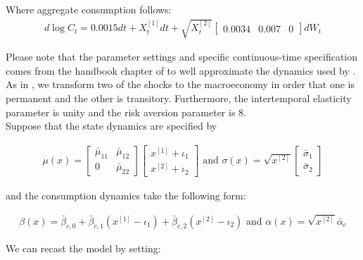 \documentclass[12pt]{article}
\begin{document}
Where aggregate consumption follows:
\begin{align*}
d\log{C_t} = 0.0015dt + X^{[1]}_t  dt + \sqrt{X^{[2]}_t} \begin{bmatrix} 0.0034 & 0.007 & 0 \end{bmatrix} dW_t
\end{align*}

Please note that the parameter settings and specific continuous-time specification comes from the handbook chapter of \cite{HHLR} to well approximate the dynamics used by \citet{bansal_yaron}. As in \citet{Hansen-2012}, we transform two of the shocks to the macroeconomy in order that one is permanent and the other is transitory. Furthermore, the intertemporal elasticity parameter is unity and the risk aversion parameter is $8$. \\

Suppose that the state dynamics are specified by

\begin{align*}
\mu(x) = \begin{bmatrix} \bar{\mu}_{11} & \bar{\mu}_{12} \\ 0 & \bar{\mu}_{22} \end{bmatrix} \begin{bmatrix}
x^{[1]} + \iota_1 \\  x^{[2]} + \iota_2 \end{bmatrix} \text{ and } \sigma(x) = \sqrt{x^{[2]}} \begin{bmatrix}
\bar{\sigma}_1 \\ \bar{\sigma}_2 \end{bmatrix}
\end{align*}

and the consumption dynamics take the following form:

\begin{align*}
\beta(x) = \bar{\beta}_{c,0} + \bar{\beta}_{c,1} (x^{[1]} - \iota_1) + \bar{\beta}_{c,2} (x^{[2]} - \iota_2) \text{ and } \alpha(x) = \sqrt{x^{[2]}} \bar{\alpha}_{c}
\end{align*}

We can recast the model by setting:
\end{document}
